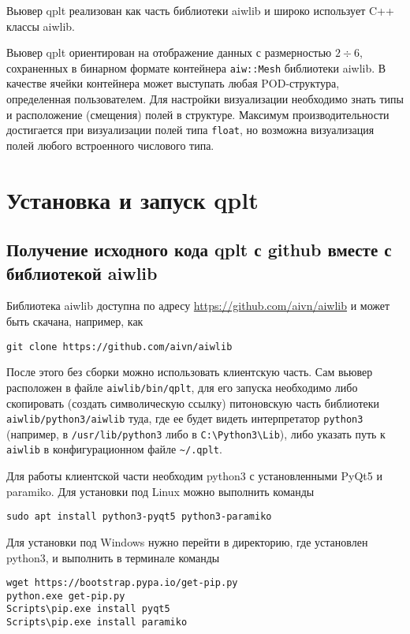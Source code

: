 \documentclass[12pt]{article}
\begin{document}
Вьювер qplt реализован как часть библиотеки aiwlib и широко использует C++ классы aiwlib.

Вьювер qplt ориентирован на отображение данных с размерностью $2\div6$, сохраненных в бинарном формате контейнера \verb'aiw::Mesh' библиотеки aiwlib.
В качестве ячейки контейнера может выступать любая POD-структура, определенная пользователем.
Для настройки визуализации необходимо знать типы и расположение (смещения) полей в структуре.
Максимум производительности достигается при визуализации полей типа \verb'float', но возможна визуализация полей
любого встроенного числового типа.

\section{Установка и запуск qplt}
\subsection{Получение исходного кода qplt с github вместе с библиотекой aiwlib}
Библиотека aiwlib доступна по адресу \href{https://github.com/aivn/aiwlib}{https://github.com/aivn/aiwlib}
и может быть скачана, например, как
\begin{verbatim}
git clone https://github.com/aivn/aiwlib
\end{verbatim}
После этого без сборки можно использовать клиентскую часть. Сам вьювер расположен в файле \verb'aiwlib/bin/qplt',
для его запуска необходимо либо скопировать (создать символическую ссылку) питоновскую часть библиотеки \verb'aiwlib/python3/aiwlib'
туда, где ее будет видеть интерпретатор \verb'python3' (например, в \verb'/usr/lib/python3' либо в \verb'C:\Python3\Lib'),
либо указать путь к \verb'aiwlib' в конфигурационном файле \verb'~/.qplt'.

Для работы клиентской части необходим python3 с установленными PyQt5 и paramiko. Для установки под Linux можно выполнить команды
\begin{verbatim}
sudo apt install python3-pyqt5 python3-paramiko
\end{verbatim}
Для установки под Windows нужно перейти в директорию, где установлен python3, и выполнить в терминале команды
\begin{verbatim}
wget https://bootstrap.pypa.io/get-pip.py 
python.exe get-pip.py
Scripts\pip.exe install pyqt5
Scripts\pip.exe install paramiko
\end{verbatim}
\end{document}
